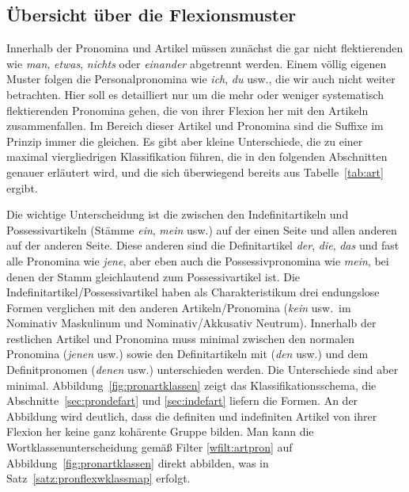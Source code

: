 \subsection{Übersicht über die Flexionsmuster}


Innerhalb der Pronomina und Artikel müssen zunächst die gar nicht flektierenden wie \textit{man}, \textit{etwas}, \textit{nichts} oder \textit{einander} abgetrennt werden.
Einem völlig eigenen Muster folgen die Personalpronomina wie \textit{ich}, \textit{du} usw., die wir auch nicht weiter betrachten.
Hier soll es detailliert nur um die mehr oder weniger systematisch flektierenden Pronomina gehen, die von ihrer Flexion her mit den Artikeln zusammenfallen.
Im Bereich dieser Artikel und Pronomina sind die Suffixe im Prinzip immer die gleichen.
Es gibt aber kleine Unterschiede, die zu einer maximal viergliedrigen Klassifikation führen, die in den folgenden Abschnitten genauer erläutert wird, und die sich überwiegend bereits aus Tabelle~\ref{tab:art} ergibt.

Die wichtige Unterscheidung ist die zwischen den Indefinitartikeln und Possessivartikeln (Stämme \textit{ein}, \textit{mein} usw.) auf der einen Seite und allen anderen auf der anderen Seite.
Diese anderen sind die Definitartikel \textit{der}, \textit{die}, \textit{das} und fast alle Pronomina wie \textit{jene}, aber eben auch die Possessivpronomina wie \textit{mein}, bei denen der Stamm gleichlautend zum Possessivartikel ist.
Die Indefinitartikel\slash Possessivartikel haben als Charakteristikum drei endungslose Formen verglichen mit den anderen Artikeln\slash Pronomina (\textit{kein} usw.\ im Nominativ Maskulinum und Nominativ\slash Akkusativ Neutrum).
Innerhalb der restlichen Artikel und Pronomina muss minimal zwischen den normalen Pronomina (\textit{jenen} usw.) sowie den Definitartikeln mit (\textit{den} usw.) und dem Definitpronomen (\textit{denen} usw.) unterschieden werden.
Die Unterschiede sind aber minimal.
Abbildung~\ref{fig:pronartklassen} zeigt das Klassifikationsschema, die Abschnitte~\ref{sec:prondefart} und \ref{sec:indefart} liefern die Formen.
An der Abbildung wird deutlich, dass die definiten und indefiniten Artikel von ihrer Flexion her keine ganz kohärente Gruppe bilden.
Man kann die Wortklassenunterscheidung gemäß Filter \ref{wfilt:artpron} auf Abbildung~\ref{fig:pronartklassen} direkt abbilden, was in Satz~\ref{satz:pronflexwklassmap} erfolgt.

